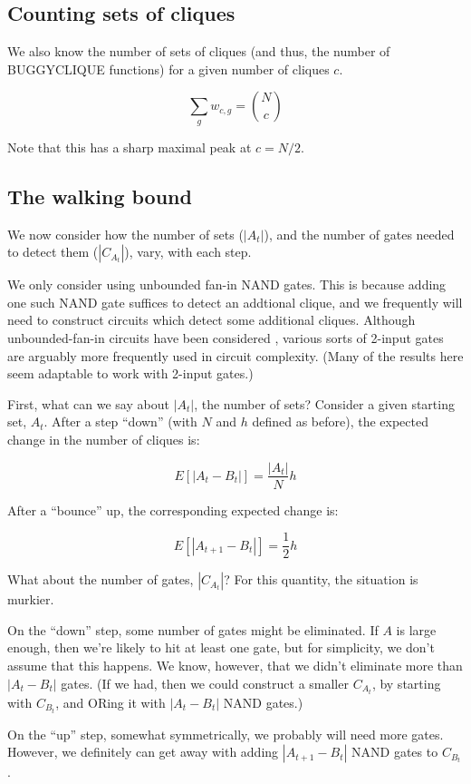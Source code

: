 \documentclass[12pt]{article}
\theoremstyle{definition}
\begin{document}
\subsection{Counting sets of cliques}

We also know the number of sets of cliques (and thus, the number
of BUGGYCLIQUE functions) for a given number of cliques $c$.

\[
\sum_g w_{c,g} = {N \choose c}
\]

Note that this has a sharp maximal peak at $c = N/2$.

\subsection{The walking bound}

We now consider how the number of sets ($|A_t|$), and
the number of gates needed to detect them ($|C_{A_t}|$),
vary, with each step.

We only consider using unbounded fan-in NAND gates.
This is because adding one such NAND gate suffices to detect an
addtional clique, and we frequently will need to construct circuits which detect
some additional cliques.
Although unbounded-fan-in circuits have been considered
\cite{wegener1991complexity}
\cite{allender1994depth}, various sorts of 2-input gates are arguably
more frequently used in circuit complexity. (Many of the results here
seem adaptable to work with 2-input gates.)

First, what can we say about $|A_t|$, the number of sets?
Consider a given starting set, $A_t$.
After a step ``down'' (with $N$ and $h$ defined as before),
the expected change in the number of cliques is:

\[
E[|A_t - B_t|] = \frac{|A_t|}{N}h
\]

After a ``bounce'' up, the corresponding expected change is:

\[
E[|A_{t+1} - B_t|] = \frac{1}{2}h
\]

What about the number of gates, $|C_{A_t}|$? For this quantity,
the situation is murkier.

On the ``down'' step, some number of gates might be eliminated.
If $A$ is large enough, then we're likely to hit at least one gate,
but for simplicity, we don't assume that this happens.
We know, however, that we didn't eliminate more than $|A_t - B_t|$
gates. (If we had, then we could construct a smaller $C_{A_t}$,
by starting with $C_{B_t}$, and ORing it with $|A_t - B_t|$
NAND gates.)

On the ``up'' step, somewhat symmetrically, we probably will
need more gates. However, we definitely can get away with
adding $|A_{t+1} - B_t|$ NAND gates to $C_{B_t}$.
\end{document}
